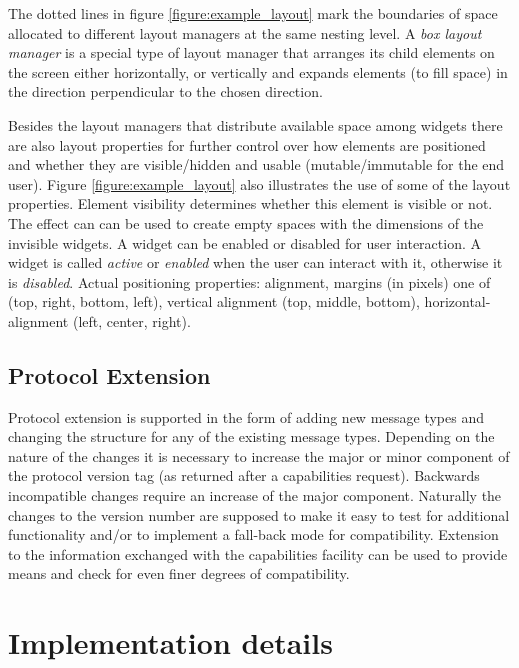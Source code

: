 \documentclass{article}
\begin{document}
    \noindent The dotted lines in figure \ref{figure:example_layout} mark the
    boundaries of space allocated to different layout managers at the same
    nesting level. A \textit{box layout manager} is a special type of layout
    manager that arranges its child elements on the screen either horizontally,
    or vertically and expands elements (to fill space) in the direction
    perpendicular to the chosen direction.

    Besides the layout managers that distribute available space among widgets
    there are also layout properties for further control over how elements are
    positioned and whether they are visible/hidden and usable
    (mutable/immutable for the end user).  Figure \ref{figure:example_layout}
    also illustrates the use of some of the layout properties.  Element
    visibility determines whether this element is visible or not. The effect
    can can be used to create empty spaces with the dimensions of the invisible
    widgets.  A widget can be enabled or disabled for user interaction. A
    widget is called \textit{active} or \textit{enabled} when the user can
    interact with it, otherwise it is \textit{disabled}. Actual positioning
    properties: alignment, margins (in pixels) one of (top, right, bottom,
    left), vertical alignment (top, middle, bottom), horizontal-alignment
    (left, center, right).

  \subsection{Protocol Extension}

   Protocol extension is supported in the form of adding new message types and
   changing the structure for any of the existing message types. Depending on
   the nature of the changes it is necessary to increase the major or minor
   component of the protocol version tag (as returned after a capabilities
   request).  Backwards incompatible changes require an increase of the major
   component. Naturally the changes to the version number are supposed to make
   it easy to test for additional functionality and/or to implement a fall-back
   mode for compatibility.  Extension to the information exchanged with the
   capabilities facility can be used to provide means and check for even finer
   degrees of compatibility.


 \section{Implementation details} \label{s:protocol_implementation}
\end{document}
